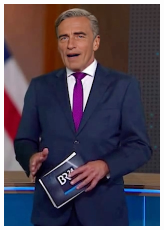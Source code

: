 \documentclass[
  a4paper,  %
  twoside,  %
  bibliography=totoc,
  headsepline,
  cleardoublepage=empty,
  parskip=half,
  draft=false
]{scrbook}
\begin{document}
\begin{figure}[h]
  \centering
  \begin{subfigure}[b]{0.4\textwidth}
    \includegraphics[width=\textwidth]{./graphics/images/scheider-real.png}
  \end{subfigure}
  \hfill
  \begin{subfigure}[b]{0.4\textwidth}

\end{subfigure}
\end{figure}
\end{document}
